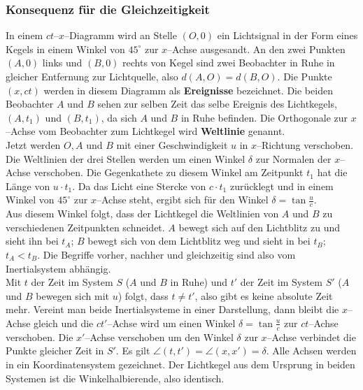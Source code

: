 \documentclass[a4paper,12pt]{article}
\begin{document}
\subsubsection{Konsequenz für die Gleichzeitigkeit}
In einem $ct$--$x$--Diagramm wird an Stelle $\left(O,0\right)$ ein Lichtsignal in der Form eines Kegels in einem Winkel von $45^\circ$ zur $x$--Achse ausgesandt. An den zwei Punkten $\left(A,0\right)$ links und $\left(B,0\right)$ rechts von Kegel sind zwei Beobachter in Ruhe in gleicher Entfernung zur Lichtquelle, also $d\left(A,O\right)=d\left(B,O\right)$. Die Punkte $\left(x,ct\right)$ werden in diesem Diagramm als \textbf{Ereignisse} bezeichnet. Die beiden Beobachter $A$ und $B$ sehen zur selben Zeit das selbe Ereignis des Lichtkegels, $\left(A,t_1\right)$ und $\left(B,t_1\right)$, da sich $A$ und $B$ in Ruhe befinden. Die Orthogonale zur $x$--Achse vom Beobachter zum Lichtkegel wird \textbf{Weltlinie} genannt.\\\indent
Jetzt werden $O,A$ und $B$ mit einer Geschwindigkeit $u$ in $x$--Richtung verschoben. Die Weltlinien der drei Stellen werden um einen Winkel $\delta $ zur Normalen der $x$--Achse verschoben. Die Gegenkathete zu diesem Winkel am Zeitpunkt $t_1$ hat die Länge von $u\cdot t_1$. Da das Licht eine Stercke von $c\cdot t_1$ zurücklegt und in einem Winkel von $45^\circ$ zur $x$--Achse steht, ergibt sich für den Winkel $\delta =\tan \tfrac{u}{c}$.\\\indent
Aus diesem Winkel folgt, dass der Lichtkegel die Weltlinien von $A$ und $B$ zu verschiedenen Zeitpunkten schneidet. $A$ bewegt sich auf den Lichtblitz zu und sieht ihn bei $t_A$; $B$ bewegt sich von dem Lichtblitz weg und sieht in bei $t_B$; $t_A<t_B$. Die Begriffe \glqq vorher\grqq{}, \glqq nachher\grqq{} und \glqq gleichzeitig\grqq{} sind also vom Inertialsystem abhängig.\\\indent
Mit $t$ der Zeit im System $S$ ($A$ und $B$ in Ruhe) und $t'$ der Zeit im System $S'$ ($A$ und $B$ bewegen sich mit $u$) folgt, dass $t \neq t'$, also gibt es keine absolute Zeit mehr. Vereint man beide Inertialsysteme in einer Darstellung, dann bleibt die $x$--Achse gleich und die $ct'$--Achse wird um einen Winkel $\delta =\tan \tfrac{u}{c}$ zur $ct$--Achse verschoben. Die $x'$--Achse verschoben um den Winkel $\delta $ zur $x$--Achse verbindet die Punkte gleicher Zeit in $S'$. Es gilt $\angle \left(t,t'\right)=\angle \left(x,x'\right)=\delta $. Alle Achsen werden in ein Koordinatensystem gezeichnet. Der Lichtkegel aus dem Ursprung in beiden Systemen ist die Winkelhalbierende, also identisch.
\end{document}
